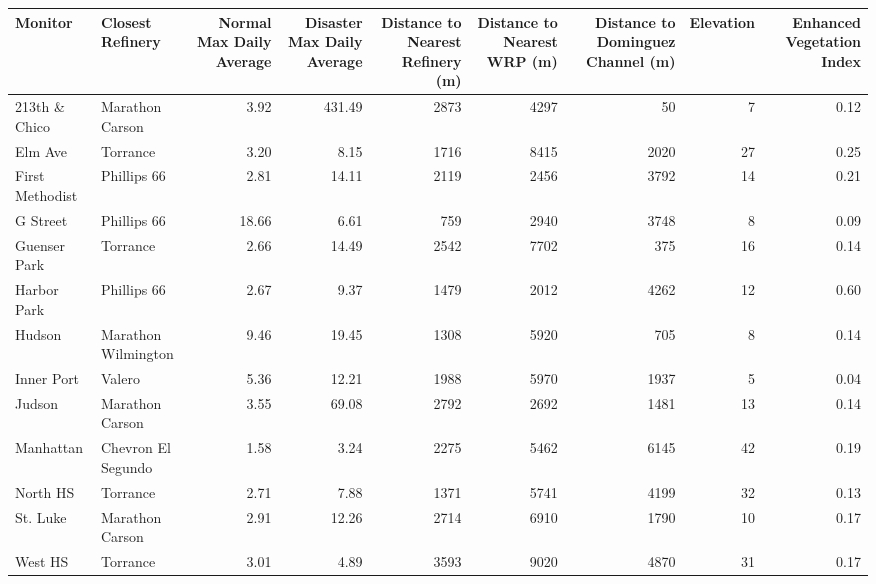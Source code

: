 
\begin{tabular}{l|l|r|r|r|r|r|r|r}
\hline
Monitor & Closest Refinery & Normal Max Daily Average & Disaster Max Daily Average & Distance to Nearest Refinery (m) & Distance to Nearest WRP (m) & Distance to Dominguez Channel (m) & Elevation & Enhanced Vegetation Index\\
\hline
213th \& Chico & Marathon Carson & 3.92 & 431.49 & 2873 & 4297 & 50 & 7 & 0.12\\
\hline
Elm Ave & Torrance & 3.20 & 8.15 & 1716 & 8415 & 2020 & 27 & 0.25\\
\hline
First Methodist & Phillips 66 & 2.81 & 14.11 & 2119 & 2456 & 3792 & 14 & 0.21\\
\hline
G Street & Phillips 66 & 18.66 & 6.61 & 759 & 2940 & 3748 & 8 & 0.09\\
\hline
Guenser Park & Torrance & 2.66 & 14.49 & 2542 & 7702 & 375 & 16 & 0.14\\
\hline
Harbor Park & Phillips 66 & 2.67 & 9.37 & 1479 & 2012 & 4262 & 12 & 0.60\\
\hline
Hudson & Marathon Wilmington & 9.46 & 19.45 & 1308 & 5920 & 705 & 8 & 0.14\\
\hline
Inner Port & Valero & 5.36 & 12.21 & 1988 & 5970 & 1937 & 5 & 0.04\\
\hline
Judson & Marathon Carson & 3.55 & 69.08 & 2792 & 2692 & 1481 & 13 & 0.14\\
\hline
Manhattan & Chevron El Segundo & 1.58 & 3.24 & 2275 & 5462 & 6145 & 42 & 0.19\\
\hline
North HS & Torrance & 2.71 & 7.88 & 1371 & 5741 & 4199 & 32 & 0.13\\
\hline
St. Luke & Marathon Carson & 2.91 & 12.26 & 2714 & 6910 & 1790 & 10 & 0.17\\
\hline
West HS & Torrance & 3.01 & 4.89 & 3593 & 9020 & 4870 & 31 & 0.17\\
\hline
\end{tabular}
